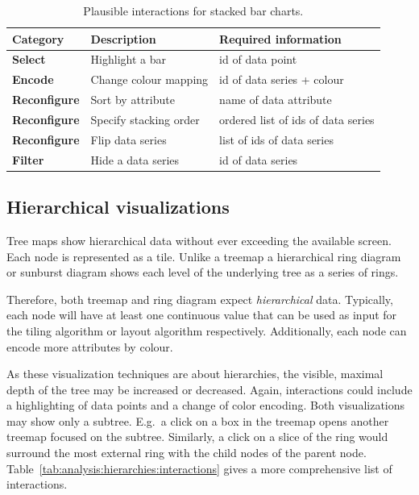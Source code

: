 \begin{table}[H]
  \caption{Plausible interactions for stacked bar charts.}%
  \label{tab:analysis:stacked-bar-chart:interactions}
  \begin{tabularx}{\linewidth}{lXX}
    \bf Category & \bf Description & \bf Required information \\
    \hline
    \bf Select & Highlight a bar & id of data point \\
    \bf Encode & Change colour mapping & id of data series + colour \\
    \bf Reconfigure & Sort by attribute & name of data attribute \\
    \bf Reconfigure & Specify stacking order & ordered list of ids of data series \\
    \bf Reconfigure & Flip data series & list of ids of data series \\
    \bf Filter & Hide a data series & id of data series \\
  \end{tabularx}
\end{table}


\subsection{Hierarchical visualizations}

Tree maps show hierarchical data without ever exceeding the available screen.
Each node is represented as a tile.
Unlike a treemap a hierarchical ring diagram or sunburst diagram shows each level of the underlying tree as a series of rings.

Therefore, both treemap and ring diagram expect \emph{hierarchical} data.
Typically, each node will have at least one continuous value that can be used as input for the tiling algorithm or layout algorithm respectively.
Additionally, each node can encode more attributes by colour.

As these visualization techniques are about hierarchies, the visible, maximal depth of the tree may be increased or decreased.
Again, interactions could include a highlighting of data points and a change of color encoding.
Both visualizations may show only a subtree.
E.g.\ a click on a box in the treemap opens another treemap focused on the subtree.
Similarly, a click on a slice of the ring would surround the most external ring with the child nodes of the parent node.
Table~\ref{tab:analysis:hierarchies:interactions} gives a more comprehensive list of interactions.

